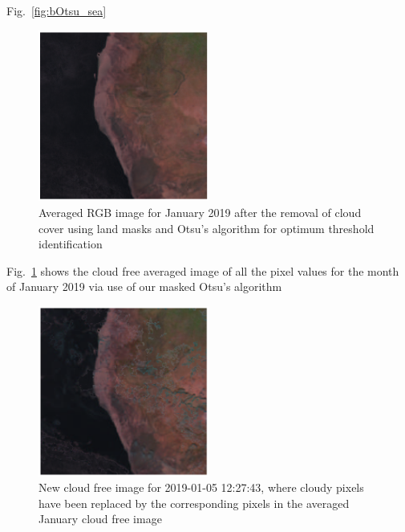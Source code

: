Fig.~\ref{fig:bOtsu_sea}

\begin{figure}
    \centering
    \includegraphics[width=0.5\textwidth]{Otsu_av_mon.png}
    \caption{Averaged RGB image for January 2019 after the removal of cloud cover using land masks and Otsu's algorithm for optimum threshold identification}
    \label{fig:av_Otsu}
\end{figure}

Fig.~\ref{fig:av_Otsu} shows the cloud free averaged image of all the pixel values for the month of January 2019 via use of our masked Otsu's algorithm

\begin{figure}[h]
    \centering
    \includegraphics[width=0.5\textwidth]{Otsu_filled_2019-01-05 122743.png}
    \caption{New cloud free image for 2019-01-05 12:27:43, where cloudy pixels have been replaced by the corresponding pixels in the averaged January cloud free image}
    \label{fig:Otsu_fill}
\end{figure}

